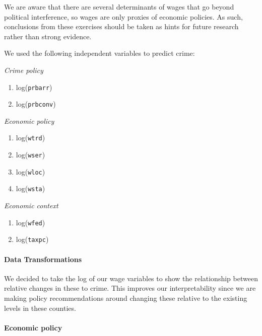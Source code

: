 \documentclass[]{article}
\let\oldparagraph\paragraph
\renewcommand{\paragraph}[1]{\oldparagraph{#1}\mbox{}}
\begin{document}
We are aware that there are several determinants of wages that go beyond
political interference, so wages are only proxies of economic policies.
As such, conclusions from these exercises should be taken as hints for
future research rather than strong evidence.

We used the following independent variables to predict crime:

\emph{Crime policy}

\begin{enumerate}
\def\labelenumi{(\arabic{enumi})}
\item
  log(\texttt{prbarr})
\item
  log(\texttt{prbconv})
\end{enumerate}

\emph{Economic policy}

\begin{enumerate}
\def\labelenumi{(\arabic{enumi})}
\setcounter{enumi}{2}
\item
  log(\texttt{wtrd})
\item
  log(\texttt{wser})
\item
  log(\texttt{wloc})
\item
  log(\texttt{wsta})
\end{enumerate}

\emph{Economic context}

\begin{enumerate}
\def\labelenumi{(\arabic{enumi})}
\setcounter{enumi}{6}
\item
  log(\texttt{wfed})
\item
  log(\texttt{taxpc})
\end{enumerate}

\hypertarget{data-transformations-1}{%
\paragraph{Data Transformations}\label{data-transformations-1}}

We decided to take the log of our wage variables to show the
relationship between relative changes in these to crime. This improves
our interpretability since we are making policy recommendations around
changing these relative to the existing levels in these counties.

\hypertarget{economic-policy-2}{%
\paragraph{Economic policy}\label{economic-policy-2}}
\end{document}
